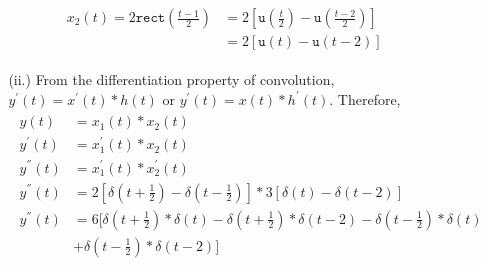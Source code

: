 \documentclass[a4paper, 12pt]{article}
\begin{document}
\begin{itemize}
\begin{itemize}
\begin{itemize}
\begin{equation}
\begin{gathered}
\begin{alignedat}{1}
x_{2}(t) = 2\mathtt{rect}\left(\frac{t-1}{2}\right) &= 2\left[\mathtt{u}\left(\frac{t}{2} \right) - \mathtt{u}\left(\frac{t - 2}{2} \right) \right] \\
&= 2\left[\mathtt{u}\left(t \right) - \mathtt{u}\left(t-2 \right) \right] 
\end{alignedat}
\end{gathered}
\end{equation}

\item[(ii.)]{From the differentiation property of convolution, $y^{'}(t) = x^{'}(t)*h(t)$ or $y^{'}(t) = x(t)*h^{'}(t)$. Therefore,}
\begin{equation}
\begin{gathered}
\begin{alignedat}{1}
y(t) &= x_{1}(t) * x_{2}(t) \\ 
y^{'}(t) &= x_{1}^{'}(t) * x_{2}(t) \\
y^{''}(t) &= x_{1}^{'}(t) * x_{2}^{'}(t) \\
y^{''}(t) &= 2\left[\delta \left( t + \frac{1}{2}\right) - \delta \left(t - \frac{1}{2} \right) \right] * 3 \left[\delta \left( t\right) - \delta \left( t - 2 \right)\right] \\
y^{''}(t) &= 6\Biggr[\delta\left( t + \frac{1}{2}\right) * \delta(t) - \delta \left(t + \frac{1}{2} \right) * \delta(t -2) - \delta\left(t - \frac{1}{2} \right)*\delta(t)\\
&+ \delta\left(t - \frac{1}{2} \right)*\delta(t-2) \Biggr] \\
\end{alignedat}
\end{gathered}
\end{equation}


\end{itemize}
\end{itemize}
\end{itemize}
\end{document}
